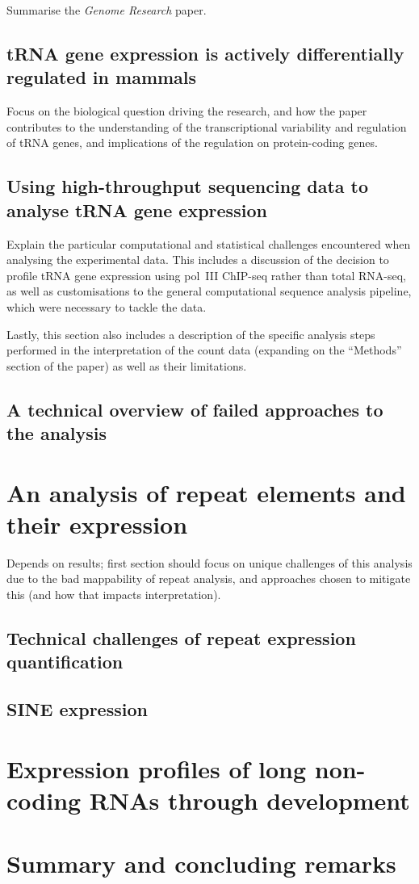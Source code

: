 Summarise the \emph{Genome Research} paper.

\subsection{tRNA gene expression is actively differentially regulated in mammals}

Focus on the biological question driving the research, and how the paper
contributes to the understanding of the transcriptional variability and
regulation of tRNA genes, and implications of the regulation on protein-coding
genes.

\subsection{Using high-throughput sequencing data to analyse tRNA gene expression}

Explain the particular computational and statistical challenges encountered
when analysing the experimental data. This includes a discussion of the
decision to profile tRNA gene expression using pol~III ChIP-seq rather than
total RNA-seq, as well as customisations to the general computational sequence
analysis pipeline, which were necessary to tackle the data.

Lastly, this section also includes a description of the specific analysis steps
performed in the interpretation of the count data (expanding on the “Methods”
section of the paper) as well as their limitations.

\subsection{A technical overview of failed approaches to the analysis}

\section{An analysis of repeat elements and their expression}

Depends on results; first section should focus on unique challenges of this
analysis due to the bad mappability of repeat analysis, and approaches chosen
to mitigate this (and how that impacts interpretation).

\subsection{Technical challenges of repeat expression quantification}

\subsection{SINE expression}

\section{Expression profiles of long non-coding RNAs through development}

\section{Summary and concluding remarks}
